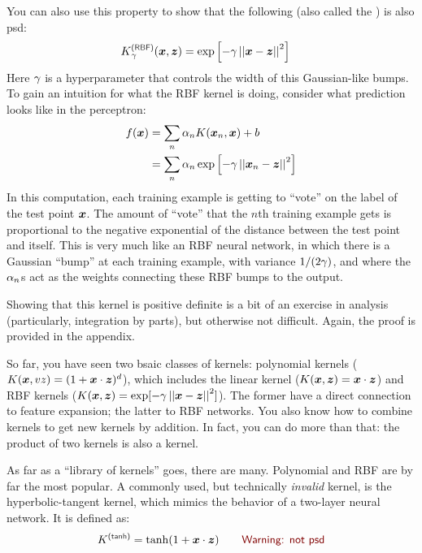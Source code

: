 You can also use this property to show that the following
 (also called the ) is
also psd:
%
\begin{align}
K\xth{RBF}_\ga(\vx,\vz) &= \exp\left[ - \ga \norm{\vx-\vz}^2 \right]
\end{align}
%
Here $\gamma$ is a hyperparameter that controls the width of this
Gaussian-like bumps.  To gain an intuition for what the RBF kernel is
doing, consider what prediction looks like in the perceptron:
%
\begin{align}
f({\boldsymbol{x}}) &= \sum_n \alpha_n K({\boldsymbol{x}}_n, {\boldsymbol{x}}) + b \\
&= \sum_n \alpha_n \exp\left[ - \gamma \left\vert\left\vert {\boldsymbol{x}}_n-{\boldsymbol{z}} \right\vert\right\vert^2 \right]
\end{align}
%
In this computation, each training example is getting to ``vote'' on
the label of the test point ${\boldsymbol{x}}$.  The amount of ``vote'' that the
$n$th training example gets is proportional to the negative
exponential of the distance between the test point and itself.  This
is very much like an RBF neural network, in which there is a Gaussian
``bump'' at each training example, with variance $1/(2\gamma)$, and where
the $\alpha_n$s act as the weights connecting these RBF bumps to the
output.

Showing that this kernel is positive definite is a bit of an exercise
in analysis (particularly, integration by parts), but otherwise not
difficult.  Again, the proof is provided in the appendix.

So far, you have seen two bsaic classes of kernels: polynomial kernels
($K({\boldsymbol{x}},vz) = (1 + {\boldsymbol{x}} \cdot {\boldsymbol{z}})^d$), which includes the linear
kernel ($K({\boldsymbol{x}},{\boldsymbol{z}}) = {\boldsymbol{x}} \cdot {\boldsymbol{z}}$) and RBF kernels ($K({\boldsymbol{x}},{\boldsymbol{z}}) =
\exp[-\gamma \left\vert\left\vert {\boldsymbol{x}}-{\boldsymbol{z}} \right\vert\right\vert^2]$).  The former have a direct connection to
feature expansion; the latter to RBF networks.  You also know how to
combine kernels to get new kernels by addition.  In fact, you can do
more than that: the product of two kernels is also a kernel.

As far as a ``library of kernels'' goes, there are many.  Polynomial
and RBF are by far the most popular.  A commonly used, but technically
\emph{invalid} kernel, is the hyperbolic-tangent kernel, which mimics
the behavior of a two-layer neural network.  It is defined as:
%
\begin{align}
K\xth{tanh} &= \tanh(1 + \dotp{\vx}{\vz})
\becauseof{Warning: not psd}
\end{align}

